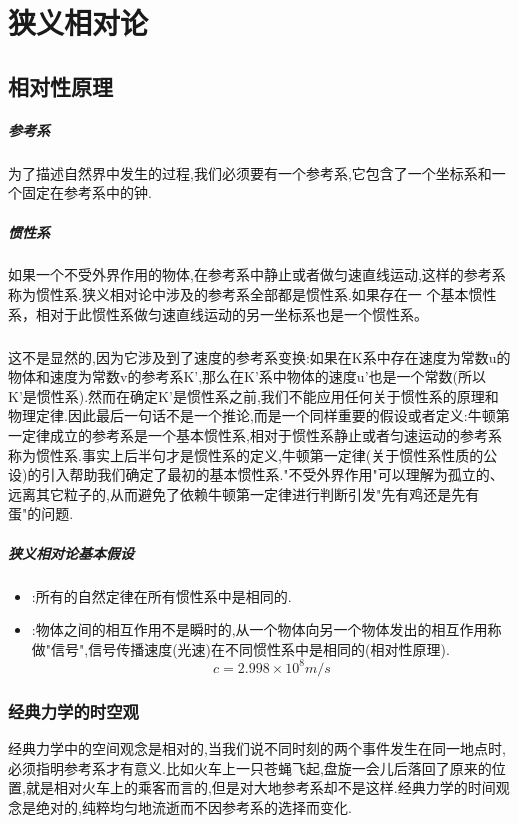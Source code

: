 \chapter{狭义相对论}
\section{相对性原理}
\paragraph{参考系}
为了描述自然界中发生的过程,我们必须要有一个参考系,它包含了一个坐标系和一个固定在参考系中的钟.
\paragraph{惯性系}
如果一个不受外界作用的物体,在参考系中静止或者做匀速直线运动,这样的参考系称为惯性系.狭义相对论中涉及的参考系全部都是惯性系.如果存在一
个基本惯性系，相对于此惯性系做匀速直线运动的另一坐标系也是一个惯性系。
\paragraph{}{\kaishu 这不是显然的,因为它涉及到了速度的参考系变换:如果在K系中存在速度为常数u的物体和速度为常数v的参考系K',那么在K'系中物体的速度u'也是一个常数(所以K'是惯性系).然而在确定K'是惯性系之前,我们不能应用任何关于惯性系的原理和物理定律.因此最后一句话不是一个推论,而是一个同样重要的假设或者定义:牛顿第一定律成立的参考系是一个基本惯性系,相对于惯性系静止或者匀速运动的参考系称为惯性系.事实上后半句才是惯性系的定义,牛顿第一定律(关于惯性系性质的公设)的引入帮助我们确定了最初的基本惯性系."不受外界作用"可以理解为孤立的、远离其它粒子的,从而避免了依赖牛顿第一定律进行判断引发"先有鸡还是先有蛋"的问题.}
\paragraph{狭义相对论基本假设}
\begin{itemize}
    \item {}:所有的自然定律在所有惯性系中是相同的.
    \item {}:物体之间的相互作用不是瞬时的,从一个物体向另一个物体发出的相互作用称做"信号",信号传播速度(光速)在不同惯性系中是相同的(相对性原理).\[ c=2.998\times 10^8 m/s\]
\end{itemize}
\subsection{经典力学的时空观}经典力学中的空间观念是相对的,当我们说不同时刻的两个事件发生在同一地点时,必须指明参考系才有意义.比如火车上一只苍蝇飞起,盘旋一会儿后落回了原来的位置,就是相对火车上的乘客而言的,但是对大地参考系却不是这样.经典力学的时间观念是绝对的,纯粹均匀地流逝而不因参考系的选择而变化.
